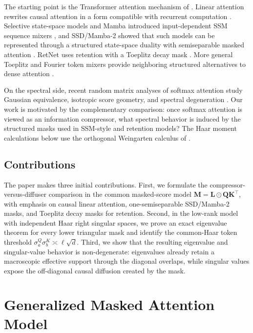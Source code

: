 \documentclass{article}
\newcommand{\hadamard}{\mathbin{\odot}}
\newcommand{\bM}{\mathbf{M}}
\newcommand{\bL}{\mathbf{L}}
\newcommand{\bQ}{\mathbf{Q}}
\newcommand{\bK}{\mathbf{K}}
\theoremstyle{remark}
\begin{document}
The starting point is the Transformer attention mechanism of
\citet{vaswani:2017attention}.  Linear attention rewrites causal attention in a
form compatible with recurrent computation
\citep{katharopoulos:2020transformers}.  Selective state-space models and
Mamba introduced input-dependent SSM sequence mixers \citep{gu:2023mamba}, and
SSD/Mamba-2 showed that such models can be represented through a structured
state-space duality with semiseparable masked attention
\citep{dao:2024transformers}.  RetNet uses retention with a Toeplitz decay mask
\citep{sun:2023retentive}.  More general Toeplitz and Fourier token mixers
provide neighboring structured alternatives to dense attention
\citep{qin:2023toeplitz,leethorp:2021fnet}.

On the spectral side, recent random matrix analyses of softmax attention study
Gaussian equivalence, isotropic score geometry, and spectral degeneration
\citep{hayase:2025gaussian,li:2026spectral}.  Our work is motivated by the
complementary comparison: once softmax attention is viewed as an information
compressor, what spectral behavior is induced by the structured masks used in
SSM-style and retention models?  The Haar moment calculations below use the
orthogonal Weingarten calculus of \citet{collins:2006integration}.

\subsection{Contributions}

The paper makes three initial contributions.  First, we formulate the
compressor-versus-diffuser comparison in the common masked-score model
$\bM=\bL\hadamard\bQ\bK^\top$, with emphasis on causal linear attention,
one-semiseparable SSD/Mamba-2 masks, and Toeplitz decay masks for retention.
Second, in the low-rank model with independent Haar right singular spaces, we
prove an exact eigenvalue theorem for every lower triangular mask and identify
the common-Haar token threshold
$\sigma_a^Q\sigma_b^K\asymp \ell\sqrt d$.  Third, we show that the resulting
eigenvalue and singular-value behavior is non-degenerate: eigenvalues already
retain a macroscopic effective support through the diagonal overlaps, while
singular values expose the off-diagonal causal diffusion created by the mask.

\section{Generalized Masked Attention Model}
\end{document}
